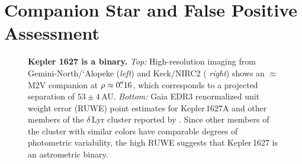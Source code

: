 \documentclass[12pt,modern,twocolumn,tighten]{aastex63}
\begin{document}
\section{Companion Star and False Positive Assessment}
\label{app:companionstar}

\begin{figure}[tp]
	\begin{center}
		\leavevmode

		\vspace{-0.1cm}
	\end{center}
	\vspace{-0.7cm}
	\caption{
    {\bf Kepler 1627 is a binary.} {\it Top:} High-resolution imaging
    from Gemini-North/`Alopeke ({\it left}) and Keck/NIRC2 ({\it
    right}) shows an $\approx$M2V companion at $\rho \approx
    0\mbox{$.\!\!^{\prime\prime}$}16$, which corresponds to a projected separation of
    $53\pm4$\,AU.  {\it Bottom:} Gaia EDR3 renormalized unit weight
    error (RUWE) point estimates for Kepler\,1627A and other members
    of the $\delta$\,Lyr cluster reported by \citet{KounkelCovey2019}.
    Since other members of the cluster with similar colors have
    comparable degrees of photometric variability, the high RUWE
    suggests that Kepler\,1627 is an astrometric binary. 
    \label{fig:kep1627binary}
	}
\end{figure}
\end{document}
